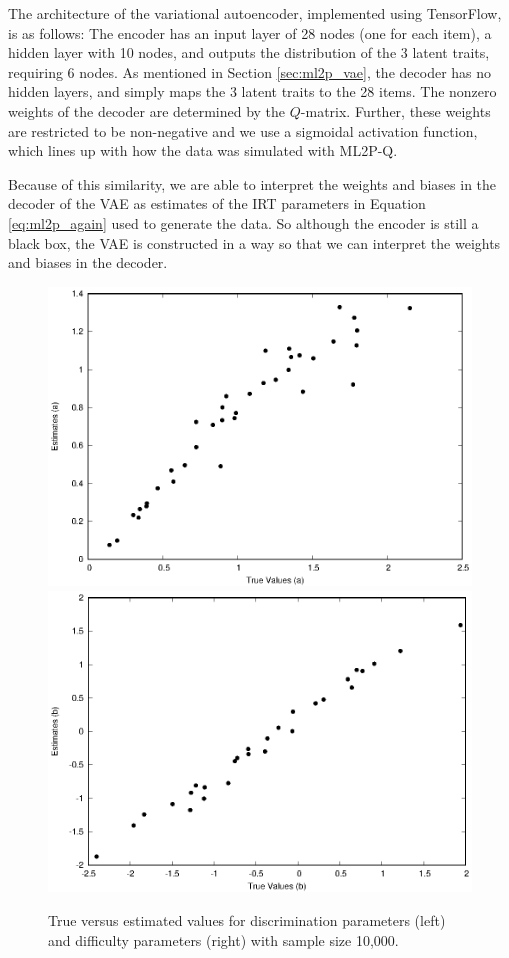 The architecture of the variational autoencoder, implemented using TensorFlow, is as follows: The encoder has an input layer of 28 nodes (one for each item), a hidden layer with 10 nodes, and outputs the distribution of the 3 latent traits, requiring 6 nodes. As mentioned in Section \ref{sec:ml2p_vae}, the decoder has no hidden layers, and simply maps the 3 latent traits to the 28 items. The nonzero weights of the decoder are determined by the $Q$-matrix. Further, these weights are restricted to be non-negative and we use a sigmoidal activation function, which lines up with how the data was simulated with ML2P-Q. 

Because of this similarity, we are able to interpret the weights and biases in the decoder of the VAE as estimates of the IRT parameters in Equation \ref{eq:ml2p_again} used to generate the data. So although the encoder is still a black box, the VAE is constructed in a way so that we can interpret the weights and biases in the decoder.

\begin{figure}[h]
  \centering
{}
\includegraphics[width=\textwidth]{img/ijcnn_results/10k_a.eps}
   \endminipage\hfill
 \includegraphics[width=\textwidth]{img/ijcnn_results/10k_b.eps}
   \endminipage\hfill
   \caption{True versus estimated values for discrimination parameters (left) and difficulty parameters (right) with sample size 10,000.}
  \label{fig:a_b_10k}
\end{figure}

